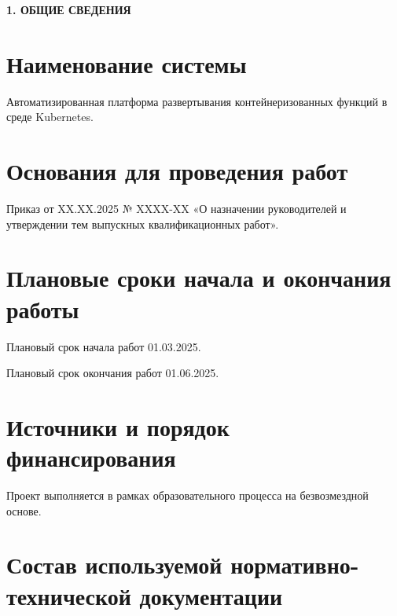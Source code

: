 \onehalfspacing
\setcounter{page}{2}

\newpage
\renewcommand{\contentsname}{\centerline{\large СОДЕРЖАНИЕ}}
\tableofcontents

\newpage
\begin{center}
  \textbf{\large 1. ОБЩИЕ СВЕДЕНИЯ}
\end{center}

\section{Наименование системы}

Автоматизированная платформа развертывания контейнеризованных \break функций в среде Kubernetes.

\section{Основания для проведения работ}

Приказ от XX.XX.2025 № XXXX-XX «О назначении руководителей и
утверждении тем выпускных квалификационных работ».

\section{Плановые сроки начала и окончания работы}

Плановый срок начала работ 01.03.2025.

Плановый срок окончания работ 01.06.2025.

\section{Источники и порядок финансирования}

Проект выполняется в рамках образовательного процесса на безвозмездной основе.

\section{Состав используемой нормативно-технической документации}
 
